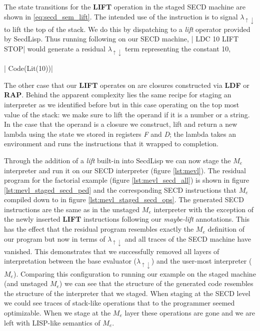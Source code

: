 \documentclass[a4paper,12pt,twoside,openright]{report}
\theoremstyle{definition}
\newcommand{\mslang}{$\lambda_{\uparrow\downarrow}$}
\newcommand{\mevl}{$M_{e}$}
\newcommand{\secdlisp}{SecdLisp}
\begin{document}
The state transitions for the \textbf{LIFT} operation in the staged SECD machine are shown in \eqref{eq:secd_sem_lift}. The intended use of the instruction is to signal \mslang{} to lift the top of the stack. We do this by dispatching to a \textit{lift} operator provided by \secdlisp. Thus running following on our SECD machine, |   LDC 10 LIFT STOP| would generate a residual \mslang{} term representing the constant 10,

|    Code(Lit(10))|

The other case that our \textbf{LIFT} operates on are closures constructed via \textbf{LDF} or \textbf{RAP}. Behind the apparent complexity lies the same recipe for staging an interpreter as we identified before but in this case operating on the top most value of the stack: we make sure to lift the operand if it is a number or a string. In the case that the operand is a closure we construct, lift and return a new lambda using the state we stored in registers \textit{F} and \textit{D}; the lambda takes an environment and runs the instructions that it wrapped to completion.

Through the addition of a \textit{lift} built-in into \secdlisp{} we can now stage the \mevl{} interpreter and run it on our SECD interpreter (figure \ref{lst:mevl}). The residual program for the factorial example (figure \ref{lst:mevl_secd_all}) is shown in figure \ref{lst:mevl_staged_secd_ped} and the corresponding SECD instructions that \mevl{} compiled down to in figure \ref{lst:mevl_staged_secd_ops}. The generated SECD instructions are the same as in the unstaged \mevl{} interpreter with the exception of the newly inserted \textbf{LIFT} instructions following our \textit{maybe-lift} annotations. This has the effect that the residual program resembles exactly the \mevl{} definition of our program but now in terms of \mslang{} and all traces of the SECD machine have vanished. This demonstrates that we successfully removed all layers of interpretation between the base evaluator (\mslang{}) and the user-most interpreter (\mevl{}). Comparing this configuration to running our example on the staged machine (and unstaged \mevl{}) we can see that the structure of the generated code resembles the structure of the interpreter that we staged. When staging at the SECD level we could see traces of stack-like operations that to the programmer seemed optimizable. When we stage at the \mevl{} layer these operations are gone and we are left with LISP-like semantics of \mevl{}.
\end{document}
